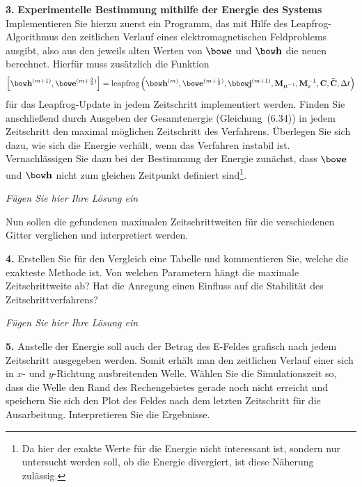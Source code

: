 \documentclass[Protokollheft.tex]{subfiles}
\begin{document}
\begin{framed}
	\noindent \textbf{3.} \textbf{Experimentelle Bestimmung mithilfe der Energie des Systems}\\
Implementieren Sie hierzu zuerst ein Programm, das mit Hilfe des Leapfrog-Algorithmus den
zeitlichen Verlauf eines elektromagnetischen Feldproblems ausgibt,
also aus den jeweils alten Werten von $\efit$ und $\hfit$ die neuen
berechnet. Hierfür muss zusätzlich die Funktion
\begin{align}
    \left[\hfit^{(m+1)},\efit^{(m+\frac{3}{2})}\right]= {\text{leapfrog}}
	\left(\hfit^{(m)},\efit^{(m+\frac{1}{2})},\jfit^{(m+1)},\Mmui,\Meps^{-1},\curlfit,\curldfit,\Delta t \right)
\end{align}
für das Leapfrog-Update in jedem Zeitschritt implementiert werden.
Finden Sie anschließend durch Ausgeben der Gesamtenergie (Gleichung~(6.34))
in jedem Zeitschritt den maximal möglichen Zeitschritt des Verfahrens.
Überlegen Sie sich dazu, wie sich die Energie verhält, wenn das Verfahren instabil ist.
Vernachlässigen Sie dazu bei der Bestimmung der Energie zunächst, dass $\efit$
und $\hfit$ nicht zum gleichen Zeitpunkt definiert sind\footnote{Da
hier der exakte Werte für die Energie nicht interessant ist,
sondern nur untersucht werden soll, ob die Energie divergiert, ist
diese Näherung zulässig.}.\label{exer:calcDeltaTmaxWithEnergy}
\end{framed}

\emph{Fügen Sie hier Ihre Lösung ein}

\noindent Nun sollen die gefundenen maximalen Zeitschrittweiten für die verschiedenen Gitter verglichen und interpretiert werden.

\begin{framed}
	\noindent \textbf{4.} Erstellen Sie für den Vergleich eine Tabelle und kommentieren Sie, welche die exakteste Methode ist. Von welchen Parametern hängt die maximale Zeitschrittweite ab? Hat die Anregung einen Einfluss auf die Stabilität des Zeitschrittverfahrens?\label{exer:compareMethods4deltaTmax}
\end{framed}

\emph{Fügen Sie hier Ihre Lösung ein}

\begin{framed}
	\noindent \textbf{5.} Anstelle der Energie soll auch der Betrag des E-Feldes grafisch nach jedem Zeitschritt ausgegeben werden.
Somit erhält man den zeitlichen Verlauf einer sich in $x$- und $y$-Richtung
ausbreitenden Welle. Wählen Sie die Simulationszeit so, dass die Welle den Rand des Rechengebietes gerade noch nicht erreicht und speichern Sie sich den Plot des Feldes nach dem letzten Zeitschritt für die Ausarbeitung. Interpretieren Sie die Ergebnisse.\label{exer:visualizeWave}
\end{framed}
\end{document}
